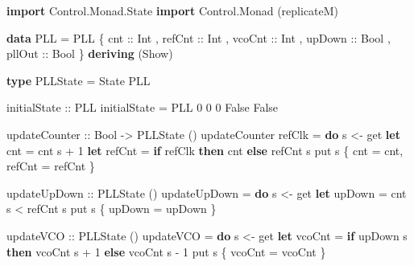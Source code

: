 \documentclass[
]{article}
\newenvironment{Shaded}{}{}
\newcommand{\DataTypeTok}[1]{\textcolor[rgb]{0.56,0.13,0.00}{#1}}
\newcommand{\DecValTok}[1]{\textcolor[rgb]{0.25,0.63,0.44}{#1}}
\newcommand{\KeywordTok}[1]{\textcolor[rgb]{0.00,0.44,0.13}{\textbf{#1}}}
\newcommand{\NormalTok}[1]{#1}
\newcommand{\OperatorTok}[1]{\textcolor[rgb]{0.40,0.40,0.40}{#1}}
\newcommand{\OtherTok}[1]{\textcolor[rgb]{0.00,0.44,0.13}{#1}}
\begin{document}
\begin{Shaded}
\begin{Highlighting}[]
\KeywordTok{import} \DataTypeTok{Control.Monad.State}
\KeywordTok{import} \DataTypeTok{Control.Monad}\NormalTok{ (replicateM)}

\KeywordTok{data} \DataTypeTok{PLL} \OtherTok{=} \DataTypeTok{PLL}
\NormalTok{  \{}\OtherTok{ cnt     ::} \DataTypeTok{Int}
\NormalTok{  ,}\OtherTok{ refCnt  ::} \DataTypeTok{Int}
\NormalTok{  ,}\OtherTok{ vcoCnt  ::} \DataTypeTok{Int}
\NormalTok{  ,}\OtherTok{ upDown  ::} \DataTypeTok{Bool}
\NormalTok{  ,}\OtherTok{ pllOut  ::} \DataTypeTok{Bool}
\NormalTok{  \} }\KeywordTok{deriving}\NormalTok{ (}\DataTypeTok{Show}\NormalTok{)}

\KeywordTok{type} \DataTypeTok{PLLState} \OtherTok{=} \DataTypeTok{State} \DataTypeTok{PLL}

\OtherTok{initialState ::} \DataTypeTok{PLL}
\NormalTok{initialState }\OtherTok{=} \DataTypeTok{PLL} \DecValTok{0} \DecValTok{0} \DecValTok{0} \DataTypeTok{False} \DataTypeTok{False}

\OtherTok{updateCounter ::} \DataTypeTok{Bool} \OtherTok{{-}\textgreater{}} \DataTypeTok{PLLState}\NormalTok{ ()}
\NormalTok{updateCounter refClk }\OtherTok{=} \KeywordTok{do}
\NormalTok{  s }\OtherTok{\textless{}{-}}\NormalTok{ get}
  \KeywordTok{let}\NormalTok{ cnt\textquotesingle{} }\OtherTok{=}\NormalTok{ cnt s }\OperatorTok{+} \DecValTok{1}
  \KeywordTok{let}\NormalTok{ refCnt\textquotesingle{} }\OtherTok{=} \KeywordTok{if}\NormalTok{ refClk }\KeywordTok{then}\NormalTok{ cnt\textquotesingle{} }\KeywordTok{else}\NormalTok{ refCnt s}
\NormalTok{  put s \{ cnt }\OtherTok{=}\NormalTok{ cnt\textquotesingle{}, refCnt }\OtherTok{=}\NormalTok{ refCnt\textquotesingle{} \}}

\OtherTok{updateUpDown ::} \DataTypeTok{PLLState}\NormalTok{ ()}
\NormalTok{updateUpDown }\OtherTok{=} \KeywordTok{do}
\NormalTok{  s }\OtherTok{\textless{}{-}}\NormalTok{ get}
  \KeywordTok{let}\NormalTok{ upDown\textquotesingle{} }\OtherTok{=}\NormalTok{ cnt s }\OperatorTok{\textless{}}\NormalTok{ refCnt s}
\NormalTok{  put s \{ upDown }\OtherTok{=}\NormalTok{ upDown\textquotesingle{} \}}

\OtherTok{updateVCO ::} \DataTypeTok{PLLState}\NormalTok{ ()}
\NormalTok{updateVCO }\OtherTok{=} \KeywordTok{do}
\NormalTok{  s }\OtherTok{\textless{}{-}}\NormalTok{ get}
  \KeywordTok{let}\NormalTok{ vcoCnt\textquotesingle{} }\OtherTok{=} \KeywordTok{if}\NormalTok{ upDown s }\KeywordTok{then}\NormalTok{ vcoCnt s }\OperatorTok{+} \DecValTok{1} \KeywordTok{else}\NormalTok{ vcoCnt s }\OperatorTok{{-}} \DecValTok{1}
\NormalTok{  put s \{ vcoCnt }\OtherTok{=}\NormalTok{ vcoCnt\textquotesingle{} \}}


\end{Highlighting}
\end{Shaded}
\end{document}
